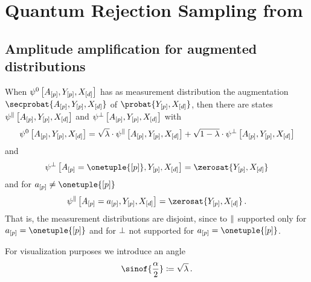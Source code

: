 \section{Quantum Rejection Sampling from \ComputationActivationNetworks{}}\label{sec:sampling}


\subsection{Amplitude amplification for augmented distributions}

When $\psi^{0}\left[A_{[p]},Y_{[p]},X_{[d]}\right]$ has as measurement distribution the augmentation $\secprobat{\avariables,\headvariables,\shortcatvariables}$ of $\probat{\headvariables,\shortcatvariables}$, then there are states $\psi^{\parallel}\left[A_{[p]},Y_{[p]},X_{[d]}\right]$ and $\psi^{\perp}\left[A_{[p]},Y_{[p]},X_{[d]}\right]$ with
\begin{align*}
    \psi^{0}\left[A_{[p]},Y_{[p]},X_{[d]}\right]
    = \sqrt{\lambda} \cdot \psi^{\parallel}\left[A_{[p]},Y_{[p]},X_{[d]}\right]
    + \sqrt{1-\lambda} \cdot \psi^{\perp}\left[A_{[p]},Y_{[p]},X_{[d]}\right]
\end{align*}
and 
\begin{align*}
    \qstateofat{\badstatesymbol}{\avariables=\onetuple{[\seldim]},\headvariables,\shortcatvariables}
    = \zerosat{\headvariables,\shortcatvariables}
\end{align*}
and for $\aindexof{[\seldim]}\neq\onetuple{[\seldim]}$
\begin{align*}
    \qstateofat{\goodstatesymbol}{\avariables=\aindexof{[\seldim]},\headvariables,\shortcatvariables}
    = \zerosat{\headvariables,\shortcatvariables} \, .
\end{align*}
That is, the measurement distributions are disjoint, since to $\parallel$ supported only for $\aindexof{[\seldim]}=\onetuple{[\seldim]}$ and for $\perp$ not supported for $\aindexof{[\seldim]}=\onetuple{[\seldim]}$.

For visualization purposes we introduce an angle
\begin{align*}
    \sinof{\frac{\rotanglesymbol}{2}} \coloneqq \sqrt{\acceptanceprob} \, .
\end{align*}

